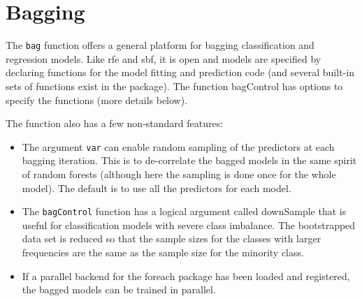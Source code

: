 \documentclass[caret-main.tex]{subfiles}
\begin{document}
\section{Bagging}

The \texttt{bag} function offers a general platform for bagging classification and regression models. Like rfe and sbf, it is open and models are specified by declaring functions for the model fitting and prediction code (and several built-in sets of functions exist in the package). The function bagControl has options to specify the functions (more details below).

The function also has a few non-standard features:

\begin{itemize}
\item The argument \texttt{var} can enable random sampling of the predictors at each bagging iteration. This is to de-correlate the bagged models in the same spirit of random forests (although here the sampling is done once for the whole model). The default is to use all the predictors for each model.
\item The \texttt{bagControl} function has a logical argument called downSample that is useful for classification models with severe class imbalance. The bootstrapped data set is reduced so that the sample sizes for the classes with larger frequencies are the same as the sample size for the minority class.
\item If a parallel backend for the foreach package has been loaded and registered, the bagged models can be trained in parallel.
\end{itemize}
\end{document}
